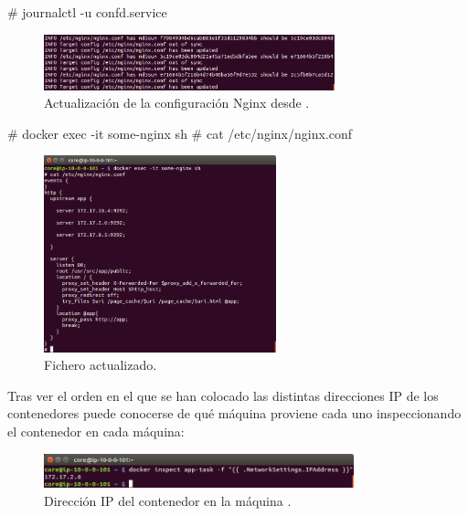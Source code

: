 \begin{code}
# journalctl -u confd.service
\end{code}

\begin{figure}[H]
\centering
\includegraphics[width=0.75\textwidth]{images/figures/update-journal-confd.png}
\caption{Actualización de la configuración Nginx desde .}
\end{figure}

\begin{code}
# docker exec -it some-nginx sh
# cat /etc/nginx/nginx.conf
\end{code}

\begin{figure}[H]
\centering
\includegraphics[width=0.6\textwidth]{images/figures/update-nginx-confd.png}
\caption{Fichero  actualizado.}
\end{figure}

Tras ver el orden en el que se han colocado las distintas direcciones IP de los contenedores  puede conocerse de qué máquina proviene cada uno inspeccionando el contenedor en cada máquina:


\begin{figure}[H]
\centering
\includegraphics[width=0.8\textwidth]{images/figures/IP1-confd.png}
\caption{Dirección IP del contenedor  en la máquina .}
\end{figure}


